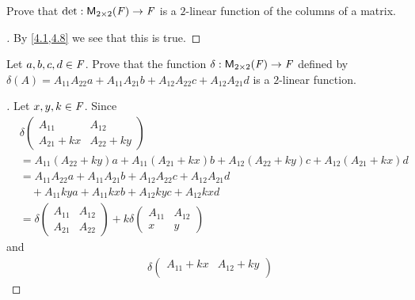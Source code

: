 \setcounter{ex}{12}
\begin{ex}\label{ex:4.5.13}
	Prove that \(\det : \ms[2][2][\F] \to \F\) is a \(2\)-linear function of the columns of a matrix.
\end{ex}

\begin{proof}[]
	By \cref{4.1,4.8} we see that this is true.
\end{proof}

\begin{ex}\label{ex:4.5.14}
	Let \(a, b, c, d \in \mathit{F}\).
	Prove that the function \(\delta : \ms[2][2][\F] \to \F\) defined by \(\delta(A) = A_{1 1} A_{2 2} a + A_{1 1} A_{2 1} b + A_{1 2} A_{2 2} c + A_{1 2} A_{2 1} d\) is a \(2\)-linear function.
\end{ex}

\begin{proof}[]
	Let \(x, y, k \in \mathit{F}\).
	Since
	\begin{align*}
		 & \delta\begin{pmatrix}
			         A_{1 1}      & A_{1 2}      \\
			         A_{2 1} + kx & A_{2 2} + ky
		         \end{pmatrix}                                                                           \\
		 & = A_{1 1} (A_{2 2} + ky) a + A_{1 1} (A_{2 1} + kx) b + A_{1 2} (A_{2 2} + ky) c + A_{1 2} (A_{2 1} + kx) d \\
		 & = A_{1 1} A_{2 2} a + A_{1 1} A_{2 1} b + A_{1 2} A_{2 2} c + A_{1 2} A_{2 1} d                             \\
		 & \quad + A_{1 1} ky a + A_{1 1} kx b + A_{1 2} ky c + A_{1 2} kx d                                           \\
		 & = \delta\begin{pmatrix}
			           A_{1 1} & A_{1 2} \\
			           A_{2 1} & A_{2 2}
		           \end{pmatrix} + k \delta\begin{pmatrix}
			                                   A_{1 1} & A_{1 2} \\
			                                   x       & y
		                                   \end{pmatrix}
	\end{align*}
	and
	\begin{align*}
		 & \delta\begin{pmatrix}
			         A_{1 1} + kx & A_{1 2} + ky \\

\end{pmatrix}
\end{align*}
\end{proof}
